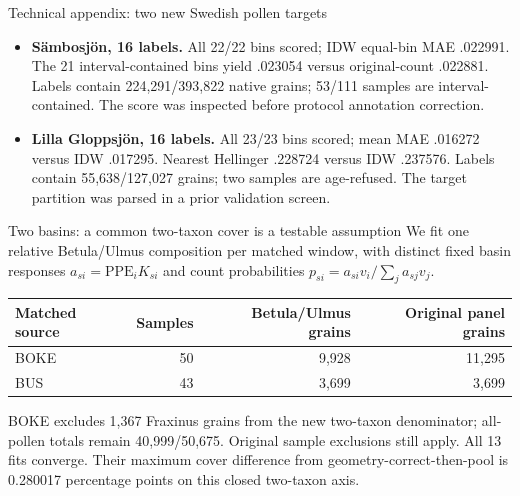 \begin{frame}{Technical appendix: two new Swedish pollen targets}
\small
\begin{itemize}
\item \textbf{S\"ambosj\"on, 16 labels.} All 22/22 bins scored; IDW equal-bin MAE .022991. The 21 interval-contained bins yield .023054 versus original-count .022881. Labels contain 224,291/393,822 native grains; 53/111 samples are interval-contained. The score was inspected before protocol annotation correction.
\item \textbf{Lilla Gloppsj\"on, 16 labels.} All 23/23 bins scored; mean MAE .016272 versus IDW .017295. Nearest Hellinger .228724 versus IDW .237576. Labels contain 55,638/127,027 grains; two samples are age-refused. The target partition was parsed in a prior validation screen.
\end{itemize}
\end{frame}

\begin{frame}{Two basins: a common two-taxon cover is a testable assumption}
\small
We fit one relative Betula/Ulmus composition per matched window, with distinct
fixed basin responses $a_{si}=\mathrm{PPE}_i K_{si}$ and count probabilities
$p_{si}=a_{si}v_i/\sum_j a_{sj}v_j$.
\begin{center}
\begin{tabular}{lrrr}
\toprule
Matched source & Samples & Betula/Ulmus grains & Original panel grains \\
\midrule
BOKE & 50 & 9,928 & 11,295 \\
BUS & 43 & 3,699 & 3,699 \\
\bottomrule
\end{tabular}
\end{center}
BOKE excludes 1,367 Fraxinus grains from the new two-taxon denominator;
all-pollen totals remain 40,999/50,675. Original sample exclusions still apply.
All 13 fits converge. Their maximum cover difference from geometry-correct-then-pool
is 0.280017 percentage points on this closed two-taxon axis.
\end{frame}

